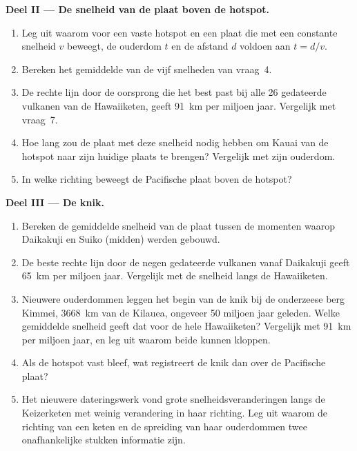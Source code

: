 \begin{problem}
\medskip
\noindent\textbf{Deel II --- De snelheid van de plaat boven de hotspot.}
\begin{enumerate}[resume]
  \item Leg uit waarom voor een vaste hotspot en een plaat die met een constante
        snelheid $v$ beweegt, de ouderdom $t$ en de afstand $d$ voldoen aan $t = d/v$.
  \item Bereken het gemiddelde van de vijf snelheden van vraag~4.
  \item De rechte lijn door de oorsprong die het best past bij alle 26 gedateerde
        vulkanen van de Hawaiiketen, geeft \qty{91}{km} per miljoen jaar.
        Vergelijk met vraag~7.
  \item Hoe lang zou de plaat met deze snelheid nodig hebben om Kauai van de
        hotspot naar zijn huidige plaats te brengen? Vergelijk met zijn ouderdom.
  \item In welke richting beweegt de Pacifische plaat boven de hotspot?
\end{enumerate}

\medskip
\noindent\textbf{Deel III --- De knik.}
\begin{enumerate}[resume]
  \item Bereken de gemiddelde snelheid van de plaat tussen de momenten waarop Daikakuji
        en Suiko (midden) werden gebouwd.
  \item De beste rechte lijn door de negen gedateerde vulkanen vanaf
        Daikakuji geeft \qty{65}{km} per miljoen jaar. Vergelijk met
        de snelheid langs de Hawaiiketen.
  \item Nieuwere ouderdommen leggen het begin van de knik bij de onderzeese berg
        Kimmei, \qty{3668}{km} van de Kilauea, ongeveer 50 miljoen jaar geleden.
        Welke gemiddelde snelheid geeft dat voor de hele Hawaiiketen?
        Vergelijk met \qty{91}{km} per miljoen jaar, en leg uit waarom beide
        kunnen kloppen.
  \item Als de hotspot vast bleef, wat registreert de knik dan over de
        Pacifische plaat?
  \item Het nieuwere dateringswerk vond grote snelheidsveranderingen langs de Keizerketen
        met weinig verandering in haar richting. Leg uit waarom de richting van een
        keten en de spreiding van haar ouderdommen twee onafhankelijke stukken
        informatie zijn.
\end{enumerate}


\end{problem}
